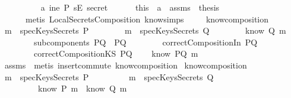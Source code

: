 \begin{isabellebody}
\ \ \ \isamarkupfalse \isanewline
\ \ \ \ \ \isamarkupfalse \ a{}{}{\isacharcolon}{\isachardoublequoteopen}{\isasymnot}\ ine\ P\ {\isacharparenleft}sE\ secret{\isacharparenright}{\isachardoublequoteclose}\isanewline
\ \ \ \ \ \isamarkupfalse \ this\ \ a{}\ \ assms\ \isamarkupfalse \ {\isacharquery}thesis\isanewline
\ \ \ \ \ \isamarkupfalse \ {\isacharparenleft}metis\ LocalSecretsComposition{}\ know{\isachardot}simps{\isacharparenleft}{}{\isacharparenright}{\isacharparenright}\isanewline
\ \ \ \isamarkupfalse \isanewline
{}\isamarkupfalse \endisatagproof
{\isafoldproof}\isadelimproof
\isanewline
\endisadelimproof
\isanewline
{}\isamarkupfalse \ know{\isacharunderscore}composition{}{\isacharcolon}\isanewline
{}\ {\isachardoublequoteopen}m\ {\isasymnotin}\ specKeysSecrets\ P{\isachardoublequoteclose}\isanewline
\ \ \ \ \ \ \ \ {\isachardoublequoteopen}m\ {\isasymnotin}\ specKeysSecrets\ Q{\isachardoublequoteclose}\isanewline
\ \ \ \ \ \ \ \ {\isachardoublequoteopen}know\ Q\ m{\isachardoublequoteclose}\isanewline
\ \ \ \ \ \ \ \ {\isachardoublequoteopen}subcomponents\ PQ\ {\isacharequal}\ {\isacharbraceleft}P{\isacharcomma}Q{\isacharbraceright}{\isachardoublequoteclose}\isanewline
\ \ \ \ \ \ \ \ {\isachardoublequoteopen}correctCompositionIn\ PQ{\isachardoublequoteclose}\isanewline
\ \ \ \ \ \ \ \ {\isachardoublequoteopen}correctCompositionKS\ PQ{\isachardoublequoteclose}\isanewline
{}\ \ \ \ {\isachardoublequoteopen}know\ PQ\ m{\isachardoublequoteclose}\isanewline
\isadelimproof
\endisadelimproof
\isatagproof
{}\isamarkupfalse \ assms\ \isamarkupfalse \ {\isacharparenleft}metis\ insert{\isacharunderscore}commute\ know{\isacharunderscore}composition{}{\isacharparenright}\endisatagproof
{\isafoldproof}\isadelimproof
\isanewline
\endisadelimproof
\isanewline
{}\isamarkupfalse \ know{\isacharunderscore}composition{\isacharcolon}\isanewline
{}\ {\isachardoublequoteopen}m\ {\isasymnotin}\ specKeysSecrets\ P{\isachardoublequoteclose}\isanewline
\ \ \ \ \ \ \ \ \ {\isachardoublequoteopen}m\ {\isasymnotin}\ specKeysSecrets\ Q{\isachardoublequoteclose}\isanewline
\ \ \ \ \ \ \ \ \ {\isachardoublequoteopen}know\ P\ m\ {\isasymor}\ know\ Q\ m{\isachardoublequoteclose}\isanewline

\end{isabellebody}
